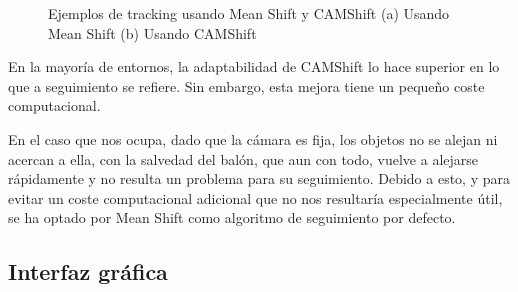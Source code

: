 \begin{figure}
\begin{subfigure}{.4\textwidth}
    \caption{ }
    \label{fig:ejemplos1b}
  \end{subfigure}
  \caption{Ejemplos de tracking usando Mean Shift y CAMShift (a) Usando Mean Shift (b) Usando CAMShift}
  \label{fig:ejemplos}
\end{figure}

En la mayoría de entornos, la adaptabilidad de CAMShift lo hace superior en lo que a seguimiento se refiere. Sin embargo, esta mejora tiene un pequeño coste computacional. 


En el caso que nos ocupa, dado que la cámara es fija, los objetos no se alejan ni acercan a ella, con la salvedad del balón, que aun con todo, vuelve a alejarse rápidamente y no resulta un problema para su seguimiento. Debido a esto, y para evitar un coste computacional adicional que no nos resultaría especialmente útil, se ha optado por Mean Shift como algoritmo de seguimiento por defecto.

\subsection{Interfaz gráfica}


